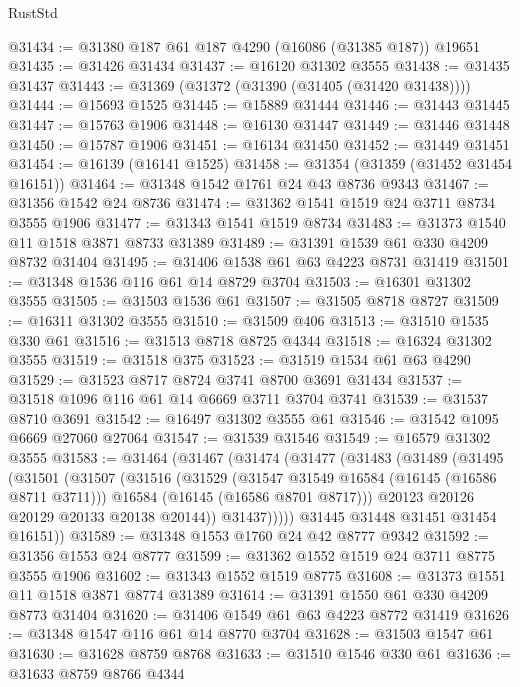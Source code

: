 \begin{lexlean}{RustStd}
\begin{coremodule}
@31434 := @31380 @187 @61 @187 @4290 (@16086 (@31385 @187)) @19651
@31435 := @31426 @31434
@31437 := @16120 @31302 @3555
@31438 := @31435 @31437
@31443 := @31369 (@31372 (@31390 (@31405 (@31420 @31438))))
@31444 := @15693 @1525
@31445 := @15889 @31444
@31446 := @31443 @31445
@31447 := @15763 @1906
@31448 := @16130 @31447
@31449 := @31446 @31448
@31450 := @15787 @1906
@31451 := @16134 @31450
@31452 := @31449 @31451
@31454 := @16139 (@16141 @1525)
@31458 := @31354 (@31359 (@31452 @31454 @16151))
@31464 := @31348 @1542 @1761 @24 @43 @8736 @9343
@31467 := @31356 @1542 @24 @8736
@31474 := @31362 @1541 @1519 @24 @3711 @8734 @3555 @1906
@31477 := @31343 @1541 @1519 @8734
@31483 := @31373 @1540 @11 @1518 @3871 @8733 @31389
@31489 := @31391 @1539 @61 @330 @4209 @8732 @31404
@31495 := @31406 @1538 @61 @63 @4223 @8731 @31419
@31501 := @31348 @1536 @116 @61 @14 @8729 @3704
@31503 := @16301 @31302 @3555
@31505 := @31503 @1536 @61
@31507 := @31505 @8718 @8727
@31509 := @16311 @31302 @3555
@31510 := @31509 @406
@31513 := @31510 @1535 @330 @61
@31516 := @31513 @8718 @8725 @4344
@31518 := @16324 @31302 @3555
@31519 := @31518 @375
@31523 := @31519 @1534 @61 @63 @4290
@31529 := @31523 @8717 @8724 @3741 @8700 @3691 @31434
@31537 := @31518 @1096 @116 @61 @14 @6669 @3711 @3704 @3741
@31539 := @31537 @8710 @3691
@31542 := @16497 @31302 @3555 @61
@31546 := @31542 @1095 @6669 @27060 @27064
@31547 := @31539 @31546
@31549 := @16579 @31302 @3555
@31583 := @31464
    (@31467
      (@31474
        (@31477
          (@31483
            (@31489
              (@31495
                (@31501
                  (@31507
                    (@31516
                      (@31529
                        (@31547 @31549 @16584 (@16145 (@16586 @8711 @3711)))
                        @16584
                        (@16145 (@16586 @8701 @8717)))
                      @20123
                      @20126
                      @20129
                      @20133
                      @20138
                      @20144))
                  @31437)))))
        @31445
        @31448
        @31451
        @31454
        @16151))
@31589 := @31348 @1553 @1760 @24 @42 @8777 @9342
@31592 := @31356 @1553 @24 @8777
@31599 := @31362 @1552 @1519 @24 @3711 @8775 @3555 @1906
@31602 := @31343 @1552 @1519 @8775
@31608 := @31373 @1551 @11 @1518 @3871 @8774 @31389
@31614 := @31391 @1550 @61 @330 @4209 @8773 @31404
@31620 := @31406 @1549 @61 @63 @4223 @8772 @31419
@31626 := @31348 @1547 @116 @61 @14 @8770 @3704
@31628 := @31503 @1547 @61
@31630 := @31628 @8759 @8768
@31633 := @31510 @1546 @330 @61
@31636 := @31633 @8759 @8766 @4344

\end{coremodule}
\end{lexlean}

